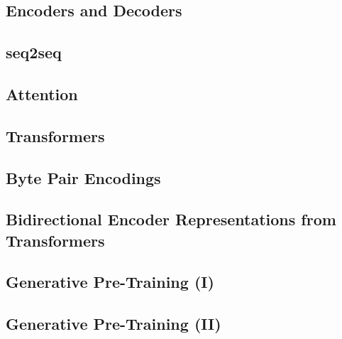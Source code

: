 \subsection{Encoders and Decoders}\label{sec:language-models:encoders-decoders}
\subsection{seq2seq}\label{sec:language-models:seq2seq}

\subsection{Attention}\label{sec:language-models:attention}


\subsection{Transformers}\label{sec:language-models:transformers}
\subsection{Byte Pair Encodings}\label{sec:language-models:bpe}

\subsection{Bidirectional Encoder Representations from Transformers}\label{sec:language-models:bert}
\subsection{Generative Pre-Training (I)}\label{sec:language-models:gpt}
\subsection{Generative Pre-Training (II)}\label{sec:language-models:gpt-2}
